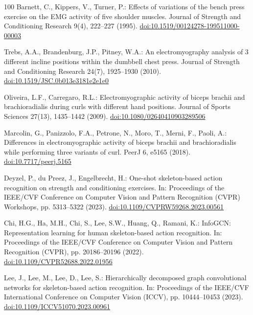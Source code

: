 \documentclass[runningheads]{llncs}
\begin{document}
\begin{thebibliography}{100}
Barnett, C., Kippers, V., Turner, P.: Effects of variations of the bench press exercise on the EMG activity of five shoulder muscles. Journal of Strength and Conditioning Research 9(4), 222--227 (1995). \href{https://doi.org/10.1519/00124278-199511000-00003}{doi:10.1519/00124278-199511000-00003}

Trebs, A.A., Brandenburg, J.P., Pitney, W.A.: An electromyography analysis of 3 different incline positions within the dumbbell chest press. Journal of Strength and Conditioning Research 24(7), 1925--1930 (2010). \href{https://doi.org/10.1519/JSC.0b013e3181e2e1e0}{doi:10.1519/JSC.0b013e3181e2e1e0}

Oliveira, L.F., Carregaro, R.L.: Electromyographic activity of biceps brachii and brachioradialis during curls with different hand positions. Journal of Sports Sciences 27(13), 1435--1442 (2009). \href{https://doi.org/10.1080/02640410903289506}{doi:10.1080/02640410903289506}

Marcolin, G., Panizzolo, F.A., Petrone, N., Moro, T., Merni, F., Paoli, A.: Differences in electromyographic activity of biceps brachii and brachioradialis while performing three variants of curl. PeerJ 6, e5165 (2018). \href{https://doi.org/10.7717/peerj.5165}{doi:10.7717/peerj.5165}

Deyzel, P., du Preez, J., Engelbrecht, H.: One-shot skeleton-based action recognition on strength and conditioning exercises. In: Proceedings of the IEEE/CVF Conference on Computer Vision and Pattern Recognition (CVPR) Workshops, pp. 5313--5322 (2023). \href{https://doi.org/10.1109/CVPRW59268.2023.00561}{doi:10.1109/CVPRW59268.2023.00561}

Chi, H.G., Ha, M.H., Chi, S., Lee, S.W., Huang, Q., Ramani, K.: InfoGCN: Representation learning for human skeleton-based action recognition. In: Proceedings of the IEEE/CVF Conference on Computer Vision and Pattern Recognition (CVPR), pp. 20186--20196 (2022). \href{https://doi.org/10.1109/CVPR52688.2022.01956}{doi:10.1109/CVPR52688.2022.01956}

Lee, J., Lee, M., Lee, D., Lee, S.: Hierarchically decomposed graph convolutional networks for skeleton-based action recognition. In: Proceedings of the IEEE/CVF International Conference on Computer Vision (ICCV), pp. 10444--10453 (2023). \href{https://doi.org/10.1109/ICCV51070.2023.00961}{doi:10.1109/ICCV51070.2023.00961}


\end{thebibliography}
\end{document}
